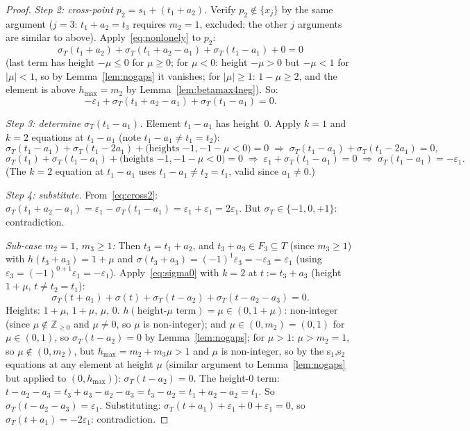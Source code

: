 \documentclass{article}
\begin{document}
\begin{proof}
\textit{Step 2: cross-point $p_2=s_1+(t_1+a_2)$.}
Verify $p_2\notin\{x_j\}$ by the same argument ($j=3$: $t_1+a_2=t_3$ requires $m_2=1$,
excluded; the other $j$ arguments are similar to above).
Apply~\eqref{eq:nonlonely} to $p_2$:
\[
  \sigma_T(t_1+a_2)+\sigma_T(t_1+a_2-a_1)+\sigma_T(t_1-a_1)+0=0
\]
(last term has height $-\mu\le 0$ for $\mu\ge 0$; for $\mu<0$: height $-\mu>0$ but
$-\mu<1$ for $|\mu|<1$, so by Lemma~\ref{lem:nogaps} it vanishes; for $|\mu|\ge 1$:
$1-\mu\ge 2$, and the element is above $h_{\max}=m_2$ by Lemma~\ref{lem:betamax4neg}).
So:
\begin{equation}\label{eq:cross2}
  -\varepsilon_1+\sigma_T(t_1+a_2-a_1)+\sigma_T(t_1-a_1)=0.
\end{equation}

\textit{Step 3: determine $\sigma_T(t_1-a_1)$.}
Element $t_1-a_1$ has height~$0$.  Apply $k=1$ and $k=2$ equations at $t_1-a_1$
(note $t_1-a_1\ne t_1=t_2$):
\[
  \sigma_T(t_1-a_1)+\sigma_T(t_1-2a_1)+\text{(heights $-1,-1-\mu<0$)}=0
  \;\Rightarrow\;
  \sigma_T(t_1-a_1)+\sigma_T(t_1-2a_1)=0,
\]
\[
  \sigma_T(t_1)+\sigma_T(t_1-a_1)+\text{(heights $-1,-1-\mu<0$)}=0
  \;\Rightarrow\;
  \varepsilon_1+\sigma_T(t_1-a_1)=0
  \;\Rightarrow\;
  \sigma_T(t_1-a_1)=-\varepsilon_1.
\]
(The $k=2$ equation at $t_1-a_1$ uses $t_1-a_1\ne t_2=t_1$, valid since $a_1\ne 0$.)

\textit{Step 4: substitute.}
From~\eqref{eq:cross2}: $\sigma_T(t_1+a_2-a_1)=\varepsilon_1-\sigma_T(t_1-a_1)=\varepsilon_1+\varepsilon_1=2\varepsilon_1$.
But $\sigma_T\in\{-1,0,+1\}$: contradiction.

\textit{Sub-case $m_2=1$, $m_3\ge 1$:}
Then $t_3=t_1+a_2$, and $t_3+a_3\in F_3\subseteq T$ (since $m_3\ge 1$)
with $h(t_3+a_3)=1+\mu$ and $\sigma(t_3+a_3)=(-1)^1\varepsilon_3=-\varepsilon_3=\varepsilon_1$
(using $\varepsilon_3=(-1)^{0+1}\varepsilon_1=-\varepsilon_1$).
Apply~\eqref{eq:sigma0} with $k=2$ at $t:=t_3+a_3$ (height $1+\mu$, $t\ne t_2=t_1$):
\[
  \sigma_T(t+a_1)+\sigma(t)+\sigma_T(t-a_2)+\sigma_T(t-a_2-a_3)=0.
\]
Heights: $1+\mu$, $1+\mu$, $\mu$, $0$.
$h(\text{height-}\mu\text{ term})=\mu\in(0,1+\mu)$: non-integer (since $\mu\notin\mathbb{Z}_{\ge 0}$
and $\mu\ne 0$, so $\mu$ is non-integer); and $\mu\in(0,m_2)=(0,1)$ for $\mu\in(0,1)$, so $\sigma_T(t-a_2)=0$
by Lemma~\ref{lem:nogaps}; for $\mu>1$: $\mu>m_2=1$, so $\mu\notin(0,m_2)$,
but $h_{\max}=m_2+m_3\mu>1$ and $\mu$ is non-integer, so by
the s$_1$,s$_2$ equations at any element at height $\mu$ (similar argument to Lemma~\ref{lem:nogaps}
but applied to $(0,h_{\max})$): $\sigma_T(t-a_2)=0$.
The height-$0$ term: $t-a_2-a_3=t_3+a_3-a_2-a_3=t_3-a_2=t_1+a_2-a_2=t_1$.
So $\sigma_T(t-a_2-a_3)=\varepsilon_1$.
Substituting: $\sigma_T(t+a_1)+\varepsilon_1+0+\varepsilon_1=0$, so $\sigma_T(t+a_1)=-2\varepsilon_1$: contradiction.


\end{proof}
\end{document}
